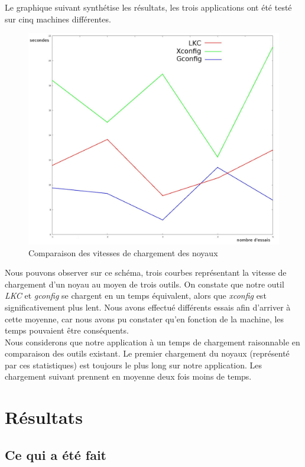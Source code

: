 \documentclass[17pts]{report}
\begin{document}
Le graphique suivant synthétise les résultats, les trois applications ont 
été testé sur cinq machines différentes.

\begin{figure}[H]
    \includegraphics[scale=0.4]{./illustrations/speed_cmp.jpeg}
    \centering
    \caption{Comparaison des vitesses de chargement des noyaux}
    \label{fig:VitesseChargement}
\end{figure}
Nous pouvons observer sur ce schéma, trois courbes représentant la vitesse
de chargement d'un noyau au moyen de trois outils.
On constate que notre outil \textit{LKC} et \textit{gconfig} se chargent en un
temps équivalent, alors que \textit{xconfig} est significativement plus lent.
Nous avons effectué différents essais afin d'arriver à cette moyenne, car nous
avons pu constater qu'en fonction de la machine, les temps pouvaient être
conséquents. \\
Nous considerons que notre application à un temps de chargement raisonnable
en comparaison des outils existant. Le premier chargement du noyaux (représenté
par ces statistiques) est toujours le plus long sur notre application. Les
chargement suivant prennent en moyenne deux fois moins de temps.

\chapter{Résultats}\thispagestyle{IHA-fancy-style}
\label{cha:Résultats}
\section{Ce qui a été fait}
\label{sec:Ce qui a été fait}
\end{document}
